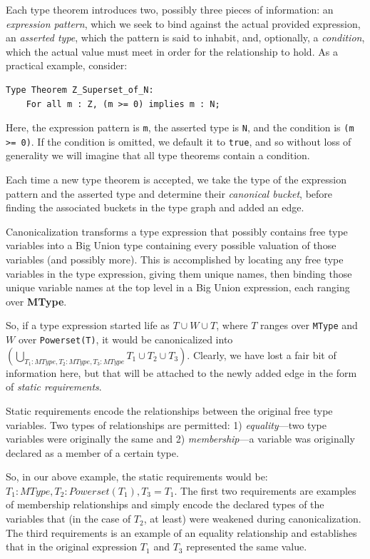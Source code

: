 Each type theorem introduces two, possibly three pieces of information: an \emph{expression pattern}, which we seek to bind against the actual provided expression, an \emph{asserted type}, which the pattern is said to inhabit, and, optionally, a \emph{condition}, which the actual value must meet in order for the relationship to hold.  As a practical example, consider:

\begin{lstlisting}
Type Theorem Z_Superset_of_N:
	For all m : Z, (m >= 0) implies m : N;
\end{lstlisting}

Here, the expression pattern is \texttt{m}, the asserted type is \texttt{N}, and the condition is \texttt{(m >= 0)}.  If the condition is omitted, we default it to \texttt{true}, and so without loss of generality we will imagine that all type theorems contain a condition.

Each time a new type theorem is accepted, we take the type of the expression pattern and the asserted type and determine their \emph{canonical bucket}, before finding the associated buckets in the type graph and added an edge.

Canonicalization transforms a type expression that possibly contains free type variables into a Big Union type containing every possible valuation of those variables (and possibly more).  This is accomplished by locating any free type variables in the type expression, giving them unique names, then binding those unique variable names at the top level in a Big Union expression, each ranging over \textbf{MType}.

So, if a type expression started life as $T \cup W \cup T$, where $T$ ranges over \texttt{MType} and $W$ over \texttt{Powerset(T)}, it would be canonicalized into $\left( \bigcup \limits_{T_1 : MType, T_2 : MType, T_3 : MType} T_1 \cup T_2 \cup T_3 \right)$.  Clearly, we have lost a fair bit of information here, but that will be attached to the newly added edge in the form of \emph{static requirements}.

Static requirements encode the relationships between the original free type variables.  Two types of relationships are permitted: 1) \emph{equality}---two type variables were originally the same and 2) \emph{membership}---a variable was originally declared as a member of a certain type.

So, in our above example, the static requirements would be: $T_1 : MType, T_2 : Powerset(T_1), T_3 = T_1$.  The first two requirements are examples of membership relationships and simply encode the declared types of the variables that (in the case of $T_2$, at least) were weakened during canonicalization.  The third requirements is an example of an equality relationship and establishes that in the original expression $T_1$ and $T_3$ represented the same value.

